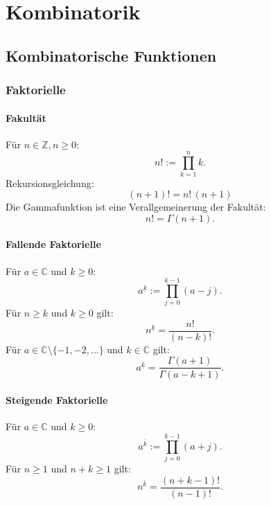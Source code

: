 
\chapter{Kombinatorik}
\section{Kombinatorische Funktionen}
\subsection{Faktorielle}
\subsubsection{Fakultät}
 Für $n\in\mathbb Z, n\ge 0$:
\begin{equation}
n! := \prod_{k=1}^n k.
\end{equation}
Rekursionsgleichung:
\begin{equation}
(n+1)! = n!\,(n+1)
\end{equation}
Die Gammafunktion ist eine Verallgemeinerung der Fakultät:
\begin{equation}
n! = \Gamma(n+1).
\end{equation}

\subsubsection{Fallende Faktorielle}
 Für $a\in\mathbb C$ und $k\ge 0$:
\begin{equation}\label{eq:FF}
a^{\underline k} := \prod_{j=0}^{k-1} (a-j).
\end{equation}
Für $n\ge k$ und $k\ge 0$ gilt:
\begin{equation}
n^{\underline k} = \frac{n!}{(n-k)!}.
\end{equation}
Für $a\in\mathbb C\setminus\{-1,-2,\ldots\}$
und $k\in\mathbb C$ gilt:
\begin{equation}
a^{\underline k} = \frac{\Gamma(a+1)}{\Gamma(a-k+1)}.
\end{equation}

\subsubsection{Steigende Faktorielle}
 Für $a\in\mathbb C$ und $k\ge 0$:
\begin{equation}
a^{\overline k} := \prod_{j=0}^{k-1} (a+j).
\end{equation}
Für $n\ge 1$ und $n+k\ge 1$ gilt:
\begin{equation}
n^{\overline k} = \frac{(n+k-1)!}{(n-1)!}.
\end{equation}

